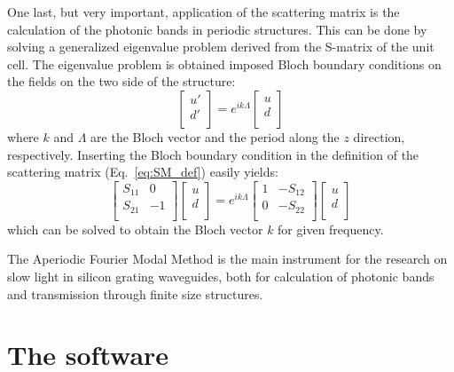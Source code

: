 \documentclass[a4paper,10pt]{report}
\begin{document}
One last, but very important, application of the scattering matrix is the calculation of the photonic bands in periodic structures. This can be done by solving a generalized eigenvalue problem derived from the S-matrix of the unit cell. The eigenvalue problem is obtained imposed Bloch boundary conditions on the fields on the two side of the structure:
\begin{equation} \label{eq:Bloch_cond}
\left[ \begin{array}{cc} u' \\ d' \\ \end{array} \right] = 
e^{ik\Lambda} \left[ \begin{array}{cc} u \\ d \\ \end{array} \right]
\end{equation}
where $k$ and $\Lambda$ are the Bloch vector and the period along the $z$ direction, respectively. 
Inserting the Bloch boundary condition in the definition of the scattering matrix (Eq.~\ref{eq:SM_def}) easily yields:
\begin{equation} \label{eq:SM_Bloch_eig}
\left[ \begin{array}{cc} S_{11} & 0 \\ S_{21} & -1 \\ \end{array} \right]
\left[ \begin{array}{c} u \\ d \\ \end{array} \right] = e^{ik\Lambda}
\left[ \begin{array}{cc} 1 & -S_{12} \\ 0 & -S_{22} \\ \end{array} \right]
\left[ \begin{array}{c} u \\ d \\ \end{array} \right] 
\end{equation}
which can be solved to obtain the Bloch vector $k$ for given frequency. 

The Aperiodic Fourier Modal Method is the main instrument for the research on slow light in silicon grating waveguides, both for calculation of photonic bands and transmission through finite size structures.

\chapter{The software}
\end{document}

